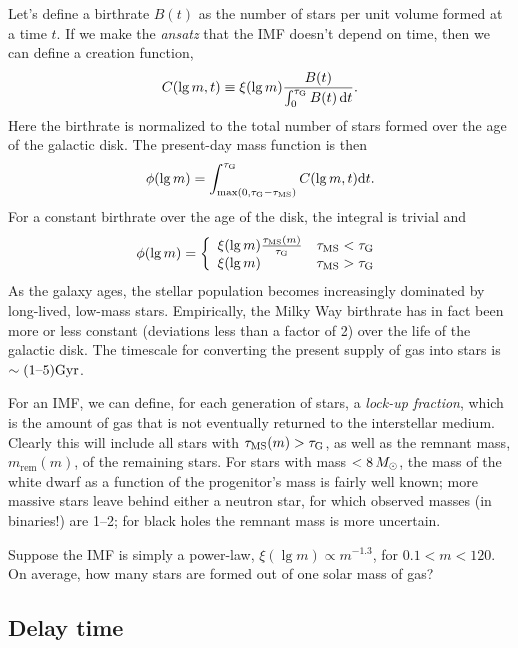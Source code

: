 Let's define a birthrate $B(t)$ as the number of stars per unit volume formed at a time $t$.  If we make the \emph{ansatz} that the IMF doesn't depend on time, then we can define a creation function,
\begin{equation}\label{e.creation-fcn}
C(\lg m,t) \equiv \xi(\lg m)\frac{B(t)}{\int_{0}^{\tau_{\mathrm{G}}} B(t)\,\mathrm{d} t}.
\end{equation}
Here the birthrate is normalized to the total number of stars formed over the age of the galactic disk. The present-day mass function is then
\[
	\phi(\lg m) = \int_{\max(0,\tau_{\mathrm{G}}-\tau_{\mathrm{MS}})}^{\tau_{\mathrm{G}}} C(\lg m,t) \mathrm{d} t.
\]
For a constant birthrate over the age of the disk, the integral is trivial and
\[
	\phi(\lg m) = \left\{\begin{array}{lr}\xi(\lg m)\frac{\tau_{\mathrm{MS}}(m)}{\tau_{\mathrm{G}}} & \tau_{\mathrm{MS}} < \tau_{\mathrm{G}} \\
		\xi(\lg m) & \tau_{\mathrm{MS}} > \tau_{\mathrm{G}}\end{array}\right.
\]
As the galaxy ages, the stellar population becomes increasingly dominated by long-lived, low-mass stars.
Empirically, the Milky Way birthrate has in fact been more or less constant (deviations less than a factor of 2) over the life of the galactic disk.  The timescale for converting the present supply of gas into stars is $\sim (1\textrm{--}5)\mathrm{G}\mathrm{yr}$.  

For an IMF, we can define, for each generation of stars, a \emph{lock-up fraction}, which is the amount of gas that is not eventually returned to the interstellar medium. Clearly this will include all stars with $\tau_{\mathrm{MS}}(m) > \tau_{\mathrm{G}}$, as well as the remnant mass, $m_{\mathrm{rem}}(m)$, of the remaining stars.  For stars with mass $< 8\,M_\odot$, the mass of the white dwarf as a function of the progenitor's mass is fairly well known; more massive stars leave behind either a neutron star, for which observed masses (in binaries!) are 1--2\nsp\Msun; for black holes the remnant mass is more uncertain.

\begin{exercisebox}
Suppose the IMF is simply a power-law, $\xi(\lg m) \propto m^{-1.3}$, for $0.1 < m < 120$. On average, how many stars are formed out of one solar mass of gas?
\end{exercisebox}

\subsection{Delay time}\label{s.delay-time}

